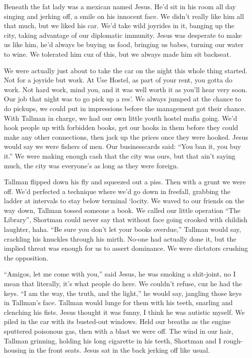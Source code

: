 \documentclass[oneside]{book}
\begin{document}
Beneath the fat lady was a mexican named Jesus.  He'd sit
in his room all day singing and jerking off, a smile on
his innocent face.  We didn't really
like him all that much, but we liked his car.  We'd take wild
joyrides in it, banging up the city, taking advantage of our
diplomatic immunity.  Jesus was desperate to make us like him,
he'd always be buying us food, bringing us babes, turning our
water to wine.  We tolerated him cuz of this, but we always made
him sit backseat.

We were actually just about to take the car on the night this
whole thing started.  Not for a joyride but work.  At Use Hostel,
as part of your rent, you gotta do work.  Not hard work, mind you,
and it was well worth it as you'll hear very soon.  Our job that
night was to go pick up a res'.  We always jumped
at the chance to do pickups, we could put in impressions
before the management got their chance.  With Tallman in charge,
we had our own little youth hostel mafia going.  We'd
hook people up with forbidden books, get our hooks in them before they
could make any other connections, then jack up the prices once they
were hooked.  Jesus would say we were fishers of men.
Our businesscards said:  ``You ban it, you buy it.''
We were making enough cash that the city was ours, but
that ain't saying much, the city was everyone's
as long as they were foreign.

Tallman flipped down his fly and squeezed out a piss.
Then with a grunt we were off.  We'd perfected
a technique where we'd go down in freefall, grabbing the ladder at
intervals to stay below terminal `locity.  We waved to our friends
on the way down, Tallman tossed someone a book.  We called our little
operation ``The Library'', Shortman could never say that without face
going crooked with childish laughter, haha.  ``Be sure you don't let your books
overdue,'' Tallman would say, crackling his knuckles through his
mirth.  No-one had actually done it, but the implied threat was
enough for us to assert dominance.  We were dictators crushing
the opposition.

``Amigos, let me come with you,'' said Jesus, he was smoking a shit-joint,
no I mean that literally, it's what people do here.  We couldn't refuse,
cuz he had the keys.  ``I am the way, the truth, and the light,''
he would say, jangling those keys in Tallman's face.  Tallman
would lunge for them with his teeth, snarling and clenching his fists.
Jesus thought it was funny, I think he was autistic myself.
We piled in the car with its busted-out windows.  Held our breaths as
the engine sputtered poisonous gas, then with a blast we were off.
The wind in our hair, Tallman grinning, holding his long cigarette in
his teeth, Shortman and I rough-housing in the front seats.  Jesus sat
in the back jerking off like usual.
\end{document}
